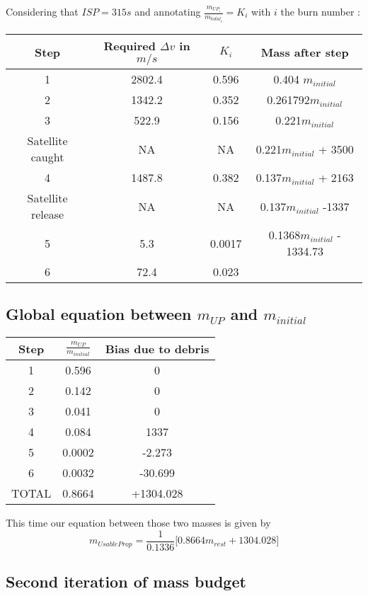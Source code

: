 Considering that \(ISP = 315s\) and annotating
\(\frac{m_{UP_i}}{m_{total_i}} = K_i\) with \(i\) the burn number :

\begin{longtable}[]{@{}cccc@{}}
\toprule
Step & Required \(\Delta v\) in \(m/s\) & \(K_i\) & Mass after
step\tabularnewline
\midrule
\endhead
1 & 2802.4 & 0.596 & 0.404 \(m_{initial}\)\tabularnewline
2 & 1342.2 & 0.352 & 0.261792\(m_{initial}\)\tabularnewline
3 & 522.9 & 0.156 & 0.221\(m_{initial}\)\tabularnewline
Satellite caught & NA & NA & 0.221\(m_{initial}\) + 3500\tabularnewline
4 & 1487.8 & 0.382 & 0.137\(m_{initial}\) + 2163\tabularnewline
Satellite release & NA & NA & 0.137\(m_{initial}\) -1337\tabularnewline
5 & 5.3 & 0.0017 & 0.1368\(m_{initial}\) - 1334.73\tabularnewline
6 & 72.4 & 0.023 &\tabularnewline
\bottomrule
\end{longtable}


\subsection{\texorpdfstring{Global equation between \(m_{UP}\) and
		\(m_{initial}\)}{Global equation between m\_\{UP\} and m\_\{initial\}}}
\begin{longtable}[]{@{}ccc@{}}
\toprule
Step & \(\frac{m_{UP}}{m_{initial}}\) & Bias due to
debris\tabularnewline
\midrule
\endhead
1 & 0.596 & 0\tabularnewline
2 & 0.142 & 0\tabularnewline
3 & 0.041 & 0\tabularnewline
4 & 0.084 & 1337\tabularnewline
5 & 0.0002 & -2.273\tabularnewline
6 & 0.0032 & -30.699\tabularnewline
TOTAL & 0.8664 & +1304.028\tabularnewline
\bottomrule
\end{longtable}



This time our equation between those two masses is given by 
\begin{equation}
m_{UsableProp} = \frac 1{0.1336}\bigg[0.8664 m_{rest} + 1304.028\bigg]
\end{equation}

\subsection{Second iteration of mass budget}

